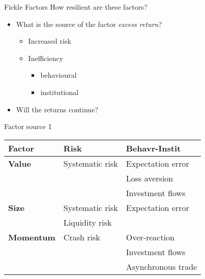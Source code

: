 \documentclass[14pt,xcolor=pdftex,dvipsnames,table]{beamer}\usepackage[]{graphicx}\usepackage[]{color}
\begin{document}
\begin{frame}{Fickle Factors}
How resilient are these factors? 
\begin{itemize}[<+-| alert@+>]
\pause
\item What is the source of the factor \emph{excess return}?
\begin{itemize}
\item Increased risk
\item Inefficiency
\begin{itemize}
\item behavioural
\item institutional
\end{itemize}
\end{itemize}
\item Will the returns continue? 
\end{itemize}
\end{frame}

\begin{frame}{Factor source 1}
\begin{table}
\begin{center}
\begin{tabular}{l l l}
\textbf{Factor} & \textbf{Risk} & \textbf{Behavr-Instit}\\
\hline
\textbf{Value} & Systematic risk & Expectation error\\
      &                 & Loss aversion\\
      &                 & Investment flows\\
\textbf{Size}  & Systematic risk & Expectation error\\
      & Liquidity risk   & \\
\textbf{Momentum} & Crash risk & Over-reaction\\
        &             & Investment flows\\
        &             & Asynchronous trade\\
\end{tabular}
\end{center}
\end{table}

\end{frame}
\end{document}
